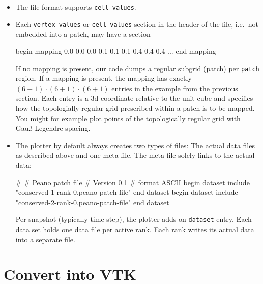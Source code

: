 \begin{itemize}
  \item The file format supports \texttt{cell-values}.
  \item Each \texttt{vertex-values} or \texttt{cell-values} section in the
  header of the file, i.e.~not embedded into a patch, may have a section
  \begin{code}
   begin mapping
     0.0 0.0 0.0
     0.1 0.1 0.1
     0.4 0.4 0.4
     ...
   end mapping
  \end{code} 
  If no mapping is present, our code dumps a regular subgrid (patch) per
  \texttt{patch} region. If a mapping is present, the mapping has exactly $(6+1)
  \cdot (6+1) \cdot (6+1)$ entries in the example from the previous section.
  Each entry is a 3d coordinate relative to the unit cube and specifies how the
  topologially regular grid prescribed within a patch is to be mapped. You might
  for example plot points of the topologically regular grid with 
  Gau\ss -Legendre spacing.
  \item The plotter by default always creates two types of files: The actual
  data files as described above and one meta file. The meta file solely links to
  the actual data:
  \begin{code}
# 
# Peano patch file 
# Version 0.1 
# 
format ASCII
begin dataset
  include "conserved-1-rank-0.peano-patch-file"
end dataset
begin dataset
  include "conserved-2-rank-0.peano-patch-file"
end dataset
  \end{code}
  Per snapshot (typically time step), the plotter adds on \texttt{dataset}
  entry. Each data set holds one data file per active rank. Each rank writes its
  actual data into a separate file. 
\end{itemize}


\section{Convert into VTK}

